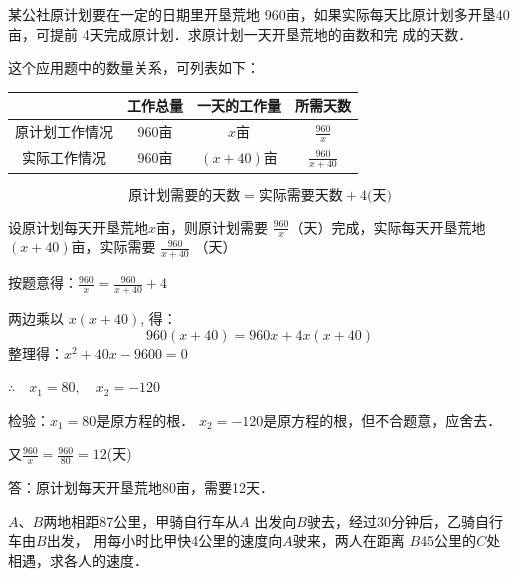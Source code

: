 \begin{example}
    某公社原计划要在一定的日期里开垦荒地
960亩，如果实际每天比原计划多开垦40亩，可提前
4天完成原计划．求原计划一天开垦荒地的亩数和完
成的天数．
\end{example}

\begin{analyze}
    这个应用题中的数量关系，可列表如下：
\begin{center}
    \renewcommand{\arraystretch}{1.8}
    \begin{tabular}{cccc}
        \hline
    &    工作总量&一天的工作量&所需天数\\
    \hline
原计划工作情况&960亩& $x$亩  & $\frac{960}{x}$\\
实际工作情况&960亩&$(x+40)$亩 & $\frac{960}{x+40}$\\
\hline
    \end{tabular}
\end{center}
\[\text{原计划需要的天数}=\text{实际需要天数}+4\text{(天)}\]
\end{analyze}


\begin{solution}
    设原计划每天开垦荒地$x$亩，则原计划需要
    $\frac{960}{x}$（天）完成，实际每天开垦荒地$(x+40)$亩，实际需要
   $\frac{960}{x+40}$
    （天）
    
    按题意得：$\frac{960}{x}=\frac{960}{x+40}+4$
    
    两边乘以
    $x(x+40)$, 得：
    \[960(x+40)=960x+4x(x+40)\]
    整理得：$x^2+40x-9600=0$

    $\therefore\quad x_1=80,\quad x_2=-120$
    
    检验：$x_1=80$是原方程的根．    $x_2=-120$是原方程的根，但不合题意，应舍去．

    又$\frac{960}{x}=\frac{960}{80}=12$(天)

    答：原计划每天开垦荒地80亩，需要12天．
\end{solution}


\begin{example}
    $A$、$B$两地相距87公里，甲骑自行车从$A$
出发向$B$驶去，经过30分钟后，乙骑自行车由$B$出发，
用每小时比甲快4公里的速度向$A$驶来，两人在距离
$B$45公里的$C$处相遇，求各人的速度．
\end{example}

